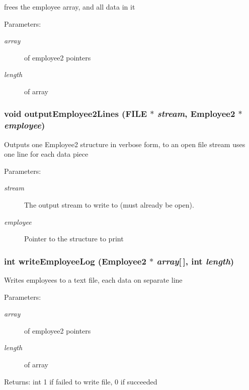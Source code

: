 frees the employee array, and all data in it \begin{Desc}
\item[Parameters:]
\begin{description}
\item[{\em array}]of employee2 pointers \item[{\em length}]of array \end{description}
\end{Desc}
\subsubsection{\setlength{\rightskip}{0pt plus 5cm}void output\-Employee2Lines (FILE $\ast$ {\em stream}, \bf{Employee2} $\ast$ {\em employee})}\label{part3_8h_a4b7fa5d06b43755ad9541e6b381a090}


Outputs one Employee2 structure in verbose form, to an open file stream uses one line for each data piece \begin{Desc}
\item[Parameters:]
\begin{description}
\item[{\em stream}]The output stream to write to (must already be open). \item[{\em employee}]Pointer to the structure to print \end{description}
\end{Desc}
\subsubsection{\setlength{\rightskip}{0pt plus 5cm}int write\-Employee\-Log (\bf{Employee2} $\ast$ {\em array}[$\,$], int {\em length})}\label{part3_8h_9ba4906a5f403b8dc58afcc1af8303cd}


Writes employees to a text file, each data on separate line \begin{Desc}
\item[Parameters:]
\begin{description}
\item[{\em array}]of employee2 pointers \item[{\em length}]of array \end{description}
\end{Desc}
\begin{Desc}
\item[Returns:]int 1 if failed to write file, 0 if succeeded \end{Desc}
